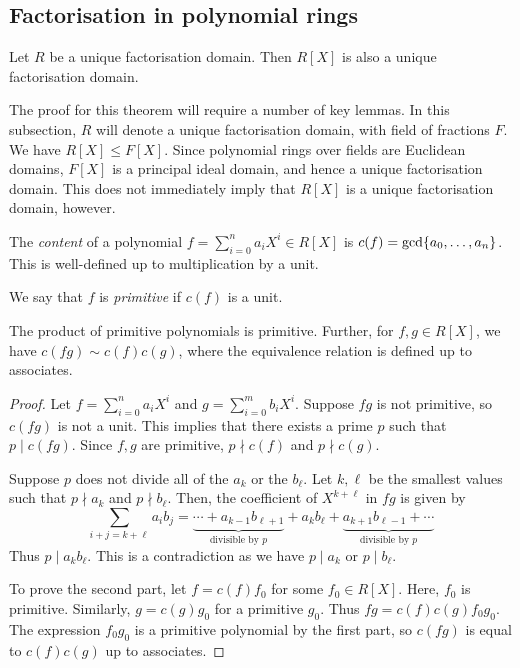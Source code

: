 \subsection{Factorisation in polynomial rings}
\begin{theorem}
	Let \( R \) be a unique factorisation domain.
	Then \( R[X] \) is also a unique factorisation domain.
\end{theorem}
The proof for this theorem will require a number of key lemmas.
In this subsection, \( R \) will denote a unique factorisation domain, with field of fractions \( F \).
We have \( R[X] \leq F[X] \).
Since polynomial rings over fields are Euclidean domains, \( F[X] \) is a principal ideal domain, and hence a unique factorisation domain.
This does not immediately imply that \( R[X] \) is a unique factorisation domain, however.
\begin{definition}
	The \textit{content} of a polynomial \( f = \sum_{i=0}^n a_i X^i \in R[X] \) is \( c(f) = \mathrm{gcd}\qty{a_0, \dots, a_n} \).
	This is well-defined up to multiplication by a unit.

	We say that \( f \) is \textit{primitive} if \( c(f) \) is a unit.
\end{definition}
\begin{lemma}
	The product of primitive polynomials is primitive.
	Further, for \( f, g \in R[X] \), we have \( c(fg) \sim c(f)c(g) \), where the equivalence relation is defined up to associates.
\end{lemma}
\begin{proof}
	Let \( f = \sum_{i=0}^n a_i X^i \) and \( g = \sum_{i=0}^m b_i X^i \).
	Suppose \( fg \) is not primitive, so \( c(fg) \) is not a unit.
	This implies that there exists a prime \( p \) such that \( p \mid c(fg) \).
	Since \( f, g \) are primitive, \( p \nmid c(f) \) and \( p \nmid c(g) \).

	Suppose \( p \) does not divide all of the \( a_k \) or the \( b_\ell \).
	Let \( k, \ell \) be the smallest values such that \( p \nmid a_k \) and \( p \nmid b_\ell \).
	Then, the coefficient of \( X^{k+\ell} \) in \( fg \) is given by
	\[ \sum_{i+j=k+\ell} a_i b_j = \underbrace{\cdots + a_{k-1} b_{\ell+1}}_{\text{divisible by } p} + a_k b_\ell + \underbrace{a_{k+1} b_{\ell - 1} + \cdots}_{\text{divisible by } p} \]
	Thus \( p \mid a_k b_\ell \).
	This is a contradiction as we have \( p \mid a_k \) or \( p \mid b_\ell \).

	To prove the second part, let \( f = c(f) f_0 \) for some \( f_0 \in R[X] \).
	Here, \( f_0 \) is primitive.
	Similarly, \( g = c(g) g_0 \) for a primitive \( g_0 \).
	Thus \( fg = c(f) c(g) f_0 g_0 \).
	The expression \( f_0 g_0 \) is a primitive polynomial by the first part, so \( c(fg) \) is equal to \( c(f) c(g) \) up to associates.
\end{proof}
